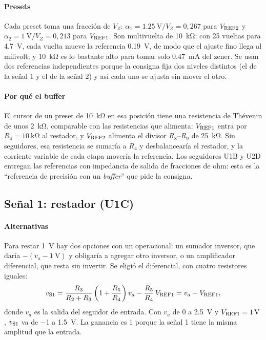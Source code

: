 \paragraph*{Presets} Cada preset toma una fracción de $V_Z$: $\alpha_1 = \SI{1,25}{\volt}/V_Z = 0{,}267$ para $V_{\mathrm{REF2}}$ y $\alpha_2 = \SI{1}{\volt}/V_Z = 0{,}213$ para $V_{\mathrm{REF1}}$. Son multivuelta de \SI{10}{\kilo\ohm}: con 25 vueltas para \SI{4,7}{\volt}, cada vuelta mueve la referencia \SI{0,19}{\volt}, de modo que el ajuste fino llega al milivolt; y \SI{10}{\kilo\ohm} es lo bastante alto para tomar solo \SI{0,47}{\milli\ampere} del zener. Se usan dos referencias independientes porque la consigna fija dos niveles distintos (el de la señal 1 y el de la señal 2) y así cada uno se ajusta sin mover el otro.

\paragraph*{Por qué el buffer} El cursor de un preset de \SI{10}{\kilo\ohm} en esa posición tiene una resistencia de Thévenin de unos \SI{2}{\kilo\ohm}, comparable con las resistencias que alimenta: $V_{\mathrm{REF1}}$ entra por $R_4 = \SI{10}{\kilo\ohm}$ al restador, y $V_{\mathrm{REF2}}$ alimenta el divisor $R_8$--$R_9$ de \SI{25}{\kilo\ohm}. Sin seguidores, esa resistencia se sumaría a $R_4$ y desbalancearía el restador, y la corriente variable de cada etapa movería la referencia. Los seguidores U1B y U2D entregan las referencias con impedancia de salida de fracciones de ohm: esta es la ``referencia de precisión con un \emph{buffer}'' que pide la consigna.

\subsection{Señal 1: restador (U1C)}
\label{sec:s1}
\paragraph*{Alternativas} Para restar \SI{1}{\volt} hay dos opciones con un operacional: un sumador inversor, que daría $-(v_a - \SI{1}{\volt})$ y obligaría a agregar otro inversor, o un amplificador diferencial, que resta sin invertir. Se eligió el diferencial, con cuatro resistores iguales:
\begin{equation}
v_{\mathrm{S1}} = \frac{R_3}{R_2 + R_3}\left(1 + \frac{R_5}{R_4}\right) v_a - \frac{R_5}{R_4}\,V_{\mathrm{REF1}} = v_a - V_{\mathrm{REF1}},
\end{equation}
donde $v_a$ es la salida del seguidor de entrada. Con $v_a$ de \SI{0}{} a \SI{2,5}{\volt} y $V_{\mathrm{REF1}} = \SI{1}{\volt}$, $v_{\mathrm{S1}}$ va de \SI{-1}{} a \SI{1,5}{\volt}. La ganancia es 1 porque la señal 1 tiene la misma amplitud que la entrada.

